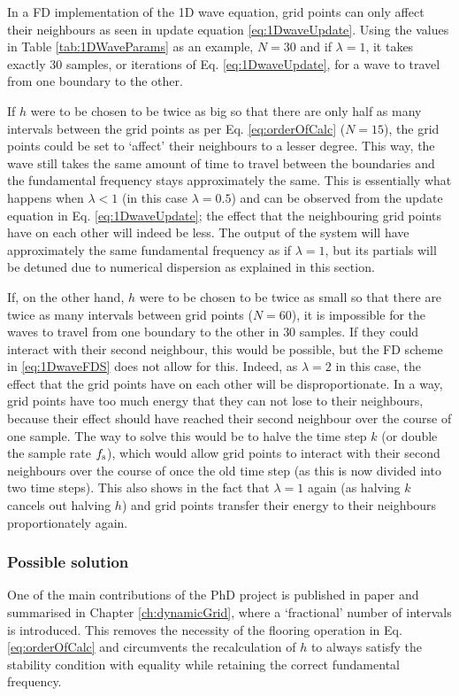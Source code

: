 In a FD implementation of the 1D wave equation, grid points can only affect their neighbours as seen in update equation \eqref{eq:1DwaveUpdate}. Using the values in Table \ref{tab:1DWaveParams} as an example, $N=30$ and if $\lambda = 1$, it takes exactly $30$ samples, or iterations of Eq. \eqref{eq:1DwaveUpdate}, for a wave to travel from one boundary to the other. 

If $h$ were to be chosen to be twice as big so that there are only half as many intervals between the grid points as per Eq. \eqref{eq:orderOfCalc} ($N=15$), the grid points could be set to `affect' their neighbours to a lesser degree. This way, the wave still takes the same amount of time to travel between the boundaries and the fundamental frequency stays approximately the same. This is essentially what happens when $\lambda < 1$ (in this case $\lambda = 0.5$) and can be observed from the update equation in Eq. \eqref{eq:1DwaveUpdate}; the effect that the neighbouring grid points have on each other will indeed be less. The output of the system will have approximately the same fundamental frequency as if $\lambda = 1$, but its partials will be detuned due to numerical dispersion as explained in this section.

If, on the other hand, $h$ were to be chosen to be twice as small so that there are twice as many intervals between grid points ($N = 60$), it is impossible for the waves to travel from one boundary to the other in $30$ samples. If they could interact with their second neighbour, this would be possible, but the FD scheme in \eqref{eq:1DwaveFDS} does not allow for this. Indeed, as $\lambda = 2$ in this case, the effect that the grid points have on each other will be disproportionate. In a way, grid points have too much energy that they can not lose to their neighbours, because their effect should have reached their second neighbour over the course of one sample. The way to solve this would be to halve the time step $k$ (or double the sample rate $f_\text{s}$), which would allow grid points to interact with their second neighbours over the course of once the old time step (as this is now divided into two time steps). This also shows in the fact that $\lambda = 1$ again (as halving $k$ cancels out halving $h$) and grid points transfer their energy to their neighbours proportionately again.

\subsubsection{Possible solution}
One of the main contributions of the PhD project is published in paper \citeP[G] and summarised in Chapter \ref{ch:dynamicGrid}, where a `fractional' number of intervals is introduced. This removes the necessity of the flooring operation in Eq. \eqref{eq:orderOfCalc} and circumvents the recalculation of $h$ to always satisfy the stability condition with equality while retaining the correct fundamental frequency.